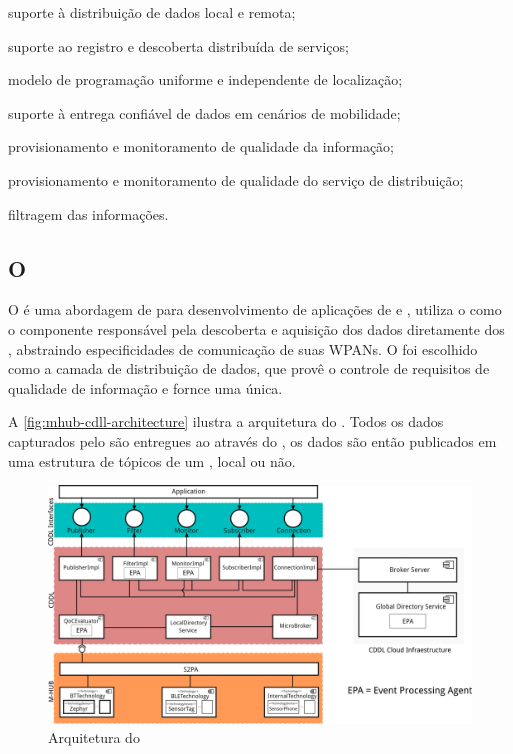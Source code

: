 \begin{alineas}
	\item suporte à distribuição de dados local e remota;

	\item suporte ao registro e descoberta distribuída de serviços;

	\item modelo de programação uniforme e independente de localização;

	\item suporte à entrega confiável de dados em cenários de mobilidade;

	\item provisionamento e monitoramento de qualidade da informação;

	\item provisionamento e monitoramento de qualidade do serviço de distribuição;

	\item filtragem das informações.
\end{alineas}

\subsection*{O \middleware \mhubcddl}

O \mhubcddl é uma abordagem de \middleware para desenvolvimento de aplicações de \iomt e \iot, utiliza o \mhub como o componente responsável pela descoberta e aquisição dos dados diretamente dos \smartobjs, abstraindo especificidades de comunicação de suas WPANs. O \cddl foi escolhido como a camada de distribuição de dados, que provê o controle de requisitos de qualidade de informação e fornce uma \api única.

A \autoref{fig:mhub-cdll-architecture} ilustra a arquitetura do \middleware. Todos os dados capturados pelo \mhub são entregues ao \cddl através do \stwopa, os dados são então publicados em uma estrutura de tópicos de um \broker \mqtt, local ou não.

\begin{figure}[htb]
	\centering
	\caption{\label{fig:mhub-cdll-architecture}Arquitetura do \mhubcddl}
	\includegraphics[width=0.85\linewidth]{img/mhub-cddl-architecture.png}
\end{figure}

